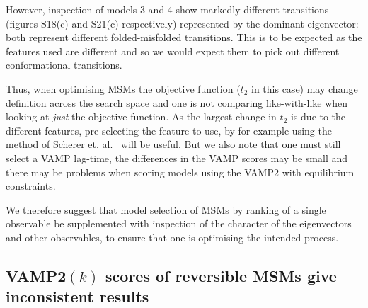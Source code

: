 \documentclass[journal=jacsat,manuscript=article]{achemso}
\begin{document}
However, inspection of models 3 and 4 show markedly different transitions (figures S18(c) and S21(c) respectively) represented by the dominant eigenvector: both represent different folded-misfolded transitions.  This is to be expected as the features used are different and so we would expect them to pick out different conformational transitions. 

Thus, when optimising MSMs the objective function ($t_2$ in this case) may change definition across the search space and one is not comparing like-with-like when looking at \emph{just} the objective function.  As the largest change in $t_2$ is due to the different features, pre-selecting the feature to use, by for example using the method of Scherer et. al.~\cite{scherer_variational_2019} will be useful. But we also note that one must still select a VAMP lag-time, the differences in the VAMP scores may be small and there may be problems when scoring models using the VAMP2 with equilibrium constraints. 

We therefore suggest that model selection of MSMs by ranking of a single observable be supplemented with inspection of the character of the eigenvectors and other observables, to ensure that one is optimising the intended process. 


\subsection{VAMP2$(k)$ scores of reversible MSMs give inconsistent results}\label{sec:vamps_inconsistent}
\end{document}
